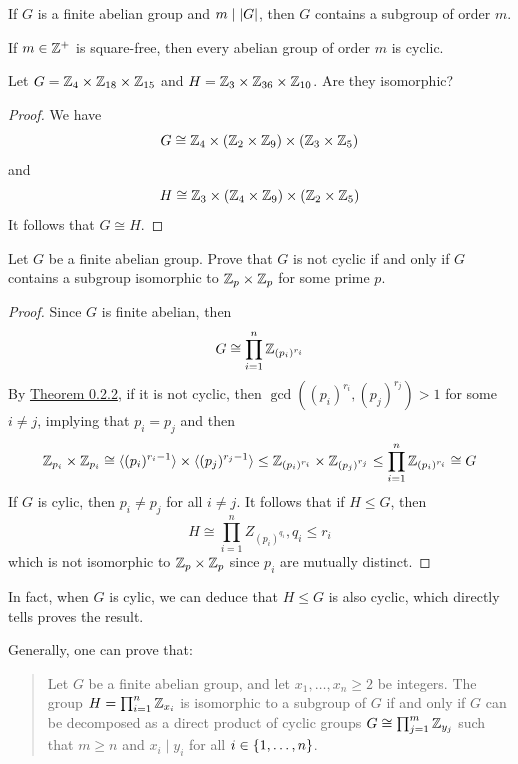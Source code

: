 \documentclass[12pt,a4paper]{article}
\begin{document}
    \begin{thm}
        If $G$ is a finite abelian group and $m \mid \left\lvert G \right\rvert$, then $G$ contains a subgroup of order $m$.
    \end{thm}
    \bigskip

    \begin{thm}
        If $m \in \mathbb{Z}^+$ is square-free, then every abelian group of order $m$ is cyclic.
    \end{thm}
    \bigskip
    
    \begin{ex}
        Let $G=\mathbb{Z}_4\times\mathbb{Z}_{18}\times\mathbb{Z}_{15}$ and $H=\mathbb{Z}_3\times\mathbb{Z}_{36}\times\mathbb{Z}_{10}$. Are they isomorphic?
    \end{ex}
    \begin{proof}
        We have 
        \[
            G\cong\mathbb{Z}_4\times(\mathbb{Z}_2\times\mathbb{Z}_9)\times(\mathbb{Z}_3\times\mathbb{Z}_5)
        \]
        and 
        \[
            H\cong\mathbb{Z}_3\times(\mathbb{Z}_4\times\mathbb{Z}_9)\times(\mathbb{Z}_2\times\mathbb{Z}_5)
        \]
        It follows that $G\cong H$.
    \end{proof}
    \bigskip

    \begin{ex}
        Let $G$ be a finite abelian group. Prove that $G$ is not cyclic if and only if $G$ contains a subgroup isomorphic to $\mathbb{Z}_p\times\mathbb{Z}_p$ for some prime $p$.
    \end{ex}
    \begin{proof}
        Since $G$ is finite abelian, then
        \[
            G\cong\prod_{i=1}^n\mathbb{Z}_{(p_i)^{r_i}}
        \]
        By \hyperref[0.2.2]{Theorem 0.2.2}, if it is not cyclic, then $\gcd((p_i)^{r_i},(p_j)^{r_j})>1$ for some $i\neq j$, implying that $p_i=p_j$ and then
        \[
            \mathbb{Z}_{p_i}\times\mathbb{Z}_{p_i}\cong\langle (p_i)^{r_i-1} \rangle\times\langle (p_j)^{r_j-1} \rangle\leq\mathbb{Z}_{(p_i)^{r_i}}\times\mathbb{Z}_{(p_j)^{r_j}}\leq\prod_{i=1}^n\mathbb{Z}_{(p_i)^{r_i}}\cong G
        \]
        If $G$ is cylic, then $p_i\neq p_j$ for all $i\neq j$. It follows that if $H\leq G$, then
        \[
            H\cong\prod_{i=1}^nZ_{(p_i)^{q_i}},q_i\leq r_i
        \]
        which is not isomorphic to $\mathbb{Z}_p\times\mathbb{Z}_p$ since $p_i$ are mutually distinct.
    \end{proof}
    \begin{remark}
        In fact, when $G$ is cylic, we can deduce that $H\leq G$ is also cyclic, which directly tells proves the result.
    \end{remark}
    \begin{remark}
        Generally, one can prove that:
        \begin{quote}
            Let $G$ be a finite abelian group, and let $x_1,\dots,x_n\geq 2$ be integers. The group $H=\prod_{i=1}^n\mathbb{Z}_{x_i}$ is isomorphic to a subgroup of $G$ if and only if $G$ can be decomposed as a direct product of cyclic groups $G\cong\prod_{j=1}^m\mathbb{Z}_{y_j}$ such that $m\geq n$ and $x_i\mid y_i$ for all $i\in\left\{ 1,\dots,n \right\}$.
        \end{quote}
    \end{remark}
    \hfill
\end{document}
